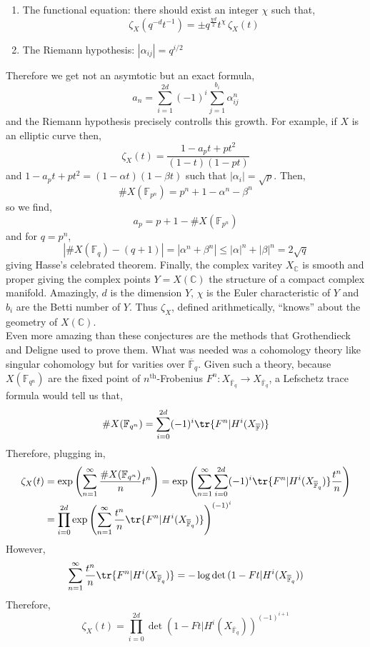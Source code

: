 \documentclass[11pt]{article}
\renewcommand{\F}{\mathbb{F}}
\newcommand{\Fbar}{\overline{\F}}
\begin{document}
\begin{enumerate}
\item The functional equation: there should exist an integer $\chi$ such that,
\[ \zeta_X(q^{-d} t^{-1}) = \pm q^{\tfrac{\chi d}{2}} t^\chi \, \zeta_X(t) \]
\item The Riemann hypothesis: $|\alpha_{ij}| = q^{i/2}$
\end{enumerate}
Therefore we get not an asymtotic but an exact formula,
\[ a_n = \sum_{i = 1}^{2d} (-1)^i \sum_{j = 1}^{b_i} \alpha_{ij}^n \]
and the Riemann hypothesis precisely controlls this growth. For example, if $X$ is an elliptic curve then,
\[ \zeta_X(t) = \frac{1 - a_p t + p t^2}{(1 - t)(1 - p t)} \]
and $1 - a_p t + p t^2 = (1 - \alpha t)(1 - \beta t)$ such that $|\alpha_i| = \sqrt{p}$. Then,
\[ \# X(\F_{p^n}) = p^n + 1 - \alpha^n - \beta^n \]
so we find,
\[ a_p = p + 1 - \# X(\F_{p^n}) \]
and for $q = p^n$,
\[ |\# X(\F_{q}) - (q + 1)| = |\alpha^n + \beta^n| \le |\alpha|^n + |\beta|^n = 2 \sqrt{q} \]
giving Hasse's celebrated theorem. Finally, the complex varitey $X_{\mathbb{C}}$ is smooth and proper giving the complex points $Y = X(\mathbb{C})$ the structure of a compact complex manifold. Amazingly, $d$ is the dimension $Y$, $\chi$ is the Euler characteristic of $Y$ and $b_i$ are the Betti number of $Y$. Thus $\zeta_X$, defined arithmetically, ``knows'' about the geometry of $X(\mathbb{C})$.
\bigskip\\
Even more amazing than these conjectures are the methods that Grothendieck and Deligne used to prove them. What was needed was a cohomology theory like singular cohomology but for varities over $\Fbar_q$. Given such a theory, because $X(\F_{q^n})$ are the fixed point of $n^{\mathrm{th}}$-Frobenius $F^n : X_{\Fbar_{q}} \to X_{\Fbar_{q}}$, a Lefschetz trace formula would tell us that,
\[ \# X(\F_{q^n}) = \sum_{i = 0}^{2d} (-1)^i \tr{F^n | H^i(X_{\Fbar})} \]
Therefore, plugging in,
\begin{align*}
\zeta_X(t) & = \exp{ \left( \sum_{n = 1}^\infty \frac{\# X(\F_{q^n})}{n} t^n \right) } = \exp{ \left( \sum_{n = 1}^\infty \sum_{i = 0}^{2d} (-1)^i \tr{F^n | H^i(X_{\Fbar_q})} \frac{t^n}{n} \right)} 
\\
& = \prod_{i = 0}^{2d} \exp{ \left( \sum_{n = 1}^\infty \frac{t^n}{n} \tr{F^n | H^i(X_{\Fbar_q})} \right)^{(-1)^i}}
\end{align*}
However,
\[ \sum_{n = 1}^\infty \frac{t^n}{n} \tr{F^n | H^i(X_{\Fbar_q})} = - \log{\det{(1 - F t | H^i(X_{\Fbar_q}))}} \]
Therefore,
\[ \zeta_X(t) = \prod_{i = 0}^{2d} \det{(1 - F t | H^i(X_{\Fbar_q}))}^{(-1)^{i+1}} \]
\end{document}
